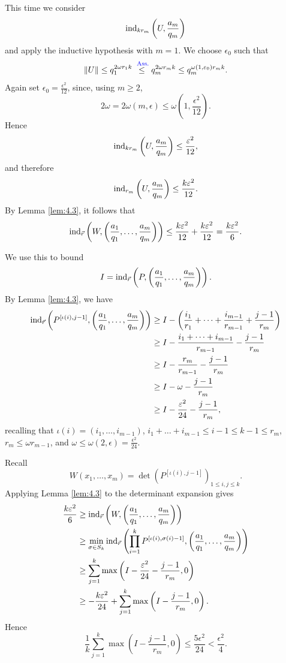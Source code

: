\documentclass{Vorlesungstemplate_English} %
\begin{document}
\begin{pf}
  This time we consider
  \[
    \ind_{kr_m}\left(U,\frac{a_m}{q_m}\right)
  \]
  and apply the inductive hypothesis with $m=1$. We choose $\epsilon_0$ such that
  \[
    \|U\|\leq q_1^{2\omega r_1k}\stackrel{\text{ \color{blue} Ass.}}{\leq} q_m^{2\omega r_mk}\leq q_m^{\omega(1,\epsilon_0)r_mk}.
  \]
  Again set $\epsilon_0=\frac{\epsilon^2}{12}$, since, using $m\geq 2$,
  \[
    2\omega=2\omega(m,\epsilon)\leq \omega\left(1,\frac{\epsilon^2}{12}\right).
  \]
  Hence
  \[
    \ind_{kr_m}\left(U,\frac{a_m}{q_m}\right)\leq \frac{\epsilon^2}{12},
  \]
  and therefore
  \[
    \ind_{r_m}\left(U,\frac{a_m}{q_m}\right)\leq \frac{k\epsilon^2}{12}.
  \]
  By Lemma \ref{lem:4.3}, it follows that
  \[
    \ind_{\vec r}\left(W,\left(\frac{a_1}{q_1},\dots,\frac{a_m}{q_m}\right)\right)\leq \frac{k\epsilon^2}{12}+\frac{k\epsilon^2}{12}=\frac{k\epsilon^2}{6}.
  \]

  We use this to bound
  \[
    I=\ind_{\vec r}\left(P,\left(\frac{a_1}{q_1},\dots,\frac{a_m}{q_m}\right)\right).
  \]
  By Lemma \ref{lem:4.3}, we have
  \begin{align*}
    \ind_{\vec r}\left(P^{[\iota(i),j-1]},\left(\frac{a_1}{q_1},\dots,\frac{a_m}{q_m}\right)\right)
    &\geq I-\left(\frac{i_1}{r_1}+\dots+\frac{i_{m-1}}{r_{m-1}}+\frac{j-1}{r_m}\right) \\
    &\geq I-\frac{i_1+\dots+i_{m-1}}{r_{m-1}}-\frac{j-1}{r_m} \\
    &\geq I-\frac{r_m}{r_{m-1}}-\frac{j-1}{r_m} \\
    &\geq I-\omega-\frac{j-1}{r_m} \\
    &\geq I-\frac{\epsilon^2}{24}-\frac{j-1}{r_m},
  \end{align*}
  recalling that $\iota(i)=(i_1,\dots,i_{m-1})$, $i_1+\dots+i_{m-1}\leq i-1\leq k-1\leq r_m$, $r_m\leq \omega r_{m-1}$, and $\omega\leq\omega(2,\epsilon)=\frac{\epsilon^2}{24}$.

  Recall
  \[
    W(x_1,\dots,x_m)=\det\left(P^{[\iota(i),j-1]}\right)_{1 \leq i,j \leq k}.
  \]
  Applying Lemma \ref{lem:4.3} to the determinant expansion gives
  \begin{align*}
    \frac{k\epsilon^2}{6}
    &\geq \ind_{\vec r}\left(W,\left(\frac{a_1}{q_1},\dots,\frac{a_m}{q_m}\right)\right) \\
    &\geq \min_{\sigma\in S_k}\ind_{\vec r}\left(
      \prod_{i=1}^k P^{[\iota(i),\sigma(i)-1]},
      \left(\frac{a_1}{q_1},\dots,\frac{a_m}{q_m}\right)
    \right) \\
    &\geq \sum_{j=1}^k\max\left(I-\frac{\epsilon^2}{24}-\frac{j-1}{r_m},0\right) \\
    &\geq -\frac{k\epsilon^2}{24}+\sum_{j=1}^k\max\left(I-\frac{j-1}{r_m},0\right).
  \end{align*}
  Hence
  \[
    \frac{1}{k}\sum_{j=1}^k\max\left(I-\frac{j-1}{r_m},0\right)\leq \frac{5\epsilon^2}{24}<\frac{\epsilon^2}{4}.
  \]


\end{pf}
\end{document}
